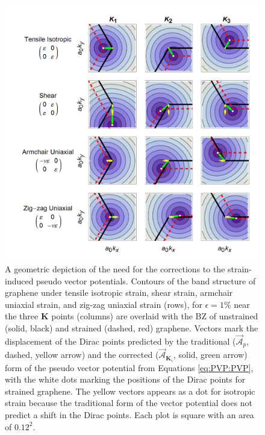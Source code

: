 \begin{figure}
  \begin{center}
  \includegraphics[scale=.75]{Figs_PVP/VPs.png}
  \end{center}
  \caption[A geometric depiction of the need for the corrections to the strain-induced pseudo vector potentials]{A geometric depiction of the need for the corrections to the strain-induced pseudo vector potentials.  Contours of the band structure of graphene under tensile isotropic strain, shear strain, armchair uniaxial strain, and zig-zag uniaxial strain (rows), for $\epsilon=1\%$ near the three $\bm{K}$ points (columns) are overlaid with the BZ of unstrained (solid, black)  and strained (dashed, red) graphene. Vectors mark the displacement of the Dirac points predicted by the traditional ($\vec{\mathcal{A}}_p$, dashed, yellow arrow) and the corrected ($\vec{\mathcal{A}}_{\bm{K}_{i}}$, solid, green arrow) form of the pseudo vector potential from Equations \ref{eq:PVP:PVP}, with the white dots marking the positions of the Dirac points for strained graphene. The yellow vectors appears as a dot for isotropic strain because the traditional form of the vector potential does not predict a shift in the Dirac points.  Each plot is square with an area of $0.12^2$. \label{fig:PVP:PVPshifts}}
\end{figure}

